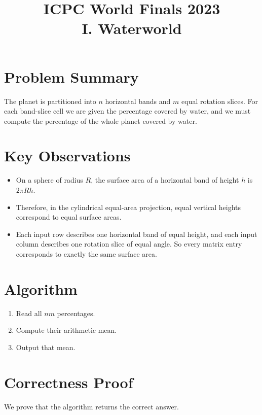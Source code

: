 \documentclass[11pt]{article}
\title{ICPC World Finals 2023\\I. Waterworld}
\author{}
\date{}
\begin{document}
\maketitle

\section*{Problem Summary}

The planet is partitioned into $n$ horizontal bands and $m$ equal rotation slices. For each band-slice
cell we are given the percentage covered by water, and we must compute the percentage of the whole
planet covered by water.

\section*{Key Observations}

\begin{itemize}[leftmargin=*]
    \item On a sphere of radius $R$, the surface area of a horizontal band of height $h$ is $2\pi Rh$.
    \item Therefore, in the cylindrical equal-area projection, equal vertical heights correspond to equal
    surface areas.
    \item Each input row describes one horizontal band of equal height, and each input column describes one
    rotation slice of equal angle. So every matrix entry corresponds to exactly the same surface area.
\end{itemize}

\section*{Algorithm}

\begin{enumerate}[leftmargin=*]
    \item Read all $nm$ percentages.
    \item Compute their arithmetic mean.
    \item Output that mean.
\end{enumerate}

\section*{Correctness Proof}

We prove that the algorithm returns the correct answer.
\end{document}
